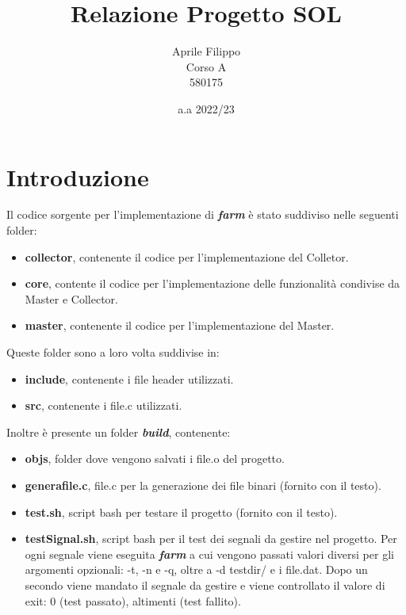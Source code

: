 \documentclass{article}
\title{Relazione Progetto SOL}
\date{a.a 2022/23}
\author{Aprile Filippo\\ Corso A \\ 580175}
\begin{document}
\maketitle
\tableofcontents

\section{Introduzione}

Il codice sorgente per l'implementazione di \textbf{\textit{farm}} è stato suddiviso nelle seguenti folder:
\begin{itemize}
    \itemsep 0em
    \item \textbf{collector}, contenente il codice per l'implementazione del Colletor.
    \item \textbf{core}, contente il codice per l'implementazione delle funzionalità condivise da Master e Collector.
    \item \textbf{master}, contenente il codice per l'implementazione del Master.
\end{itemize}

Queste folder sono a loro volta suddivise in:
\begin{itemize}
    \itemsep 0em
    \item \textbf{include}, contenente i file header utilizzati.
    \item \textbf{src}, contenente i file.c utilizzati.
\end{itemize}

Inoltre è presente un folder \textbf{\textit{build}}, contenente:
\begin{itemize}
    \itemsep 0em
    \item \textbf{objs}, folder dove vengono salvati i file.o del progetto.
    \item \textbf{generafile.c}, file.c per la generazione dei file binari (fornito con il testo).
    \item \textbf{test.sh}, script bash per testare il progetto (fornito con il testo).
    \item \textbf{testSignal.sh}, script bash per il test dei segnali da gestire nel progetto. Per ogni segnale viene eseguita \textbf{\textit{farm}} a cui vengono passati valori diversi per gli argomenti opzionali: -t, -n e -q, oltre a -d testdir/ e i file.dat. Dopo un secondo viene mandato il segnale da gestire e viene controllato il valore di exit: 0 (test passato), altimenti (test fallito).
\end{itemize}
\end{document}
